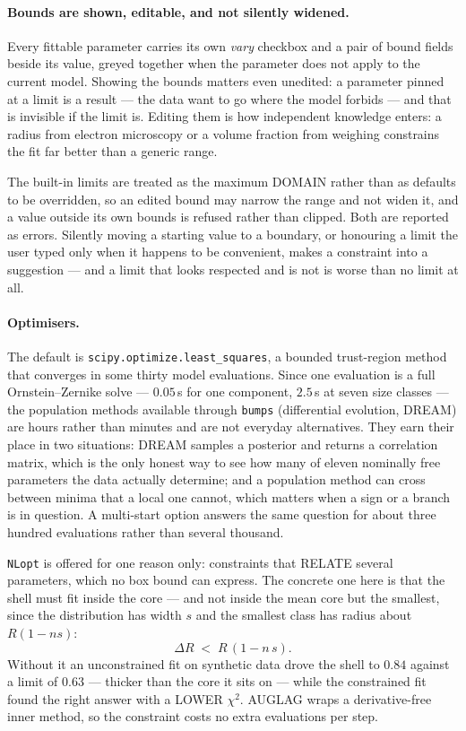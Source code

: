 \documentclass[11pt,a4paper]{article}
\newcommand{\code}[1]{\texttt{\hspace{0pt}#1}}
\begin{document}
\paragraph{Bounds are shown, editable, and not silently widened.} Every
fittable parameter carries its own \emph{vary} checkbox and a pair of bound
fields beside its value, greyed together when the parameter does not apply
to the current model. Showing the bounds matters even unedited: a parameter
pinned at a limit is a result --- the data want to go where the model
forbids --- and that is invisible if the limit is. Editing them is how
independent knowledge enters: a radius from electron microscopy or a volume
fraction from weighing constrains the fit far better than a generic range.

The built-in limits are treated as the maximum DOMAIN rather than as
defaults to be overridden, so an edited bound may narrow the range and not
widen it, and a value outside its own bounds is refused rather than clipped.
Both are reported as errors. Silently moving a starting value to a boundary,
or honouring a limit the user typed only when it happens to be convenient,
makes a constraint into a suggestion --- and a limit that looks respected and
is not is worse than no limit at all.

\paragraph{Optimisers.} The default is \code{scipy.optimize.least\_squares},
a bounded trust-region method that converges in some thirty model
evaluations. Since one evaluation is a full Ornstein--Zernike solve ---
$0.05$\,s for one component, $2.5$\,s at seven size classes --- the
population methods available through \code{bumps} (differential evolution,
DREAM) are hours rather than minutes and are not everyday alternatives. They
earn their place in two situations: DREAM samples a posterior and returns a
correlation matrix, which is the only honest way to see how many of eleven
nominally free parameters the data actually determine; and a population
method can cross between minima that a local one cannot, which matters when
a sign or a branch is in question. A multi-start option answers the same
question for about three hundred evaluations rather than several thousand.

\code{NLopt} is offered for one reason only: constraints that RELATE several
parameters, which no box bound can express. The concrete one here is that
the shell must fit inside the core --- and not inside the mean core but the
smallest, since the distribution has width $s$ and the smallest class has
radius about $R(1-ns)$:
\begin{equation}
  \Delta R \;<\; R\,(1 - n\,s).
\end{equation}
Without it an unconstrained fit on synthetic data drove the shell to $0.84$
against a limit of $0.63$ --- thicker than the core it sits on --- while the
constrained fit found the right answer with a LOWER $\chi^2$. AUGLAG wraps a
derivative-free inner method, so the constraint costs no extra evaluations
per step.
\end{document}
